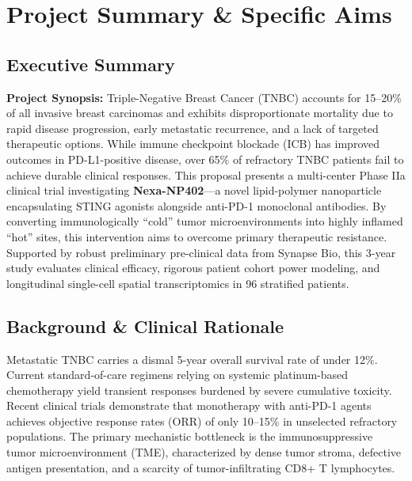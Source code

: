 \documentclass[10pt,a4paper]{article}
\begin{document}
\section{Project Summary \& Specific Aims}

\subsection{Executive Summary}
\begin{tcolorbox}[summarybox]
\textbf{\color{SecondaryTeal}Project Synopsis:} Triple-Negative Breast Cancer (TNBC) accounts for 15--20\% of all invasive breast carcinomas and exhibits disproportionate mortality due to rapid disease progression, early metastatic recurrence, and a lack of targeted therapeutic options. While immune checkpoint blockade (ICB) has improved outcomes in PD-L1-positive disease, over 65\% of refractory TNBC patients fail to achieve durable clinical responses. This proposal presents a multi-center Phase IIa clinical trial investigating \textbf{Nexa-NP402}---a novel lipid-polymer nanoparticle encapsulating STING agonists alongside anti-PD-1 monoclonal antibodies. By converting immunologically ``cold'' tumor microenvironments into highly inflamed ``hot'' sites, this intervention aims to overcome primary therapeutic resistance. Supported by robust preliminary pre-clinical data from Synapse Bio, this 3-year study evaluates clinical efficacy, rigorous patient cohort power modeling, and longitudinal single-cell spatial transcriptomics in 96 stratified patients.
\end{tcolorbox}

\subsection{Background \& Clinical Rationale}
Metastatic TNBC carries a dismal 5-year overall survival rate of under 12\%. Current standard-of-care regimens relying on systemic platinum-based chemotherapy yield transient responses burdened by severe cumulative toxicity. Recent clinical trials demonstrate that monotherapy with anti-PD-1 agents achieves objective response rates (ORR) of only 10--15\% in unselected refractory populations. The primary mechanistic bottleneck is the immunosuppressive tumor microenvironment (TME), characterized by dense tumor stroma, defective antigen presentation, and a scarcity of tumor-infiltrating CD8+ T lymphocytes.
\end{document}
